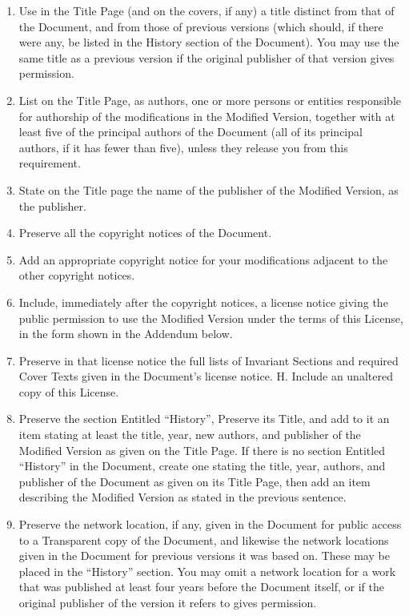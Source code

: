 {\eletras{}\begin{enumerate}

	\item Use in the Title Page (and on the covers, if any) a title
		distinct from that of the Document, and from those of
		previous versions (which should, if there were any, be
		listed in the History section of the Document). You may use
		the same title as a previous version if the original
		publisher of that version gives permission.

	\item List on the Title Page, as authors, one or more persons or
		entities responsible for authorship of the modifications in
		the Modified Version, together with at least five of the
		principal authors of the Document (all of its principal
		authors, if it has fewer than five), unless they release
		you from this requirement.

	\item State on the Title page the name of the publisher of the
		Modified Version, as the publisher.

	\item Preserve all the copyright notices of the Document.

	\item Add an appropriate copyright notice for your modifications
		adjacent to the other copyright notices.

	\item Include, immediately after the copyright notices, a license
		notice giving the public permission to use the Modified
		Version under the terms of this License, in the form shown
		in the Addendum below.

	\item Preserve in that license notice the full lists of Invariant
		Sections and required Cover Texts given in the Document's
		license notice. H. Include an unaltered copy of this
		License.

	\item Preserve the section Entitled ``History'', Preserve its
		Title, and add to it an item stating at least the title,
		year, new authors, and publisher of the Modified Version as
		given on the Title Page. If there is no section Entitled
		``History'' in the Document, create one stating the title,
		year, authors, and publisher of the Document as given on
		its Title Page, then add an item describing the Modified
		Version as stated in the previous sentence.

	\item Preserve the network location, if any, given in the Document
		for public access to a Transparent copy of the Document,
		and likewise the network locations given in the Document
		for previous versions it was based on. These may be placed
		in the ``History'' section. You may omit a network location
		for a work that was published at least four years before
		the Document itself, or if the original publisher of the
		version it refers to gives permission.


\end{enumerate}}
